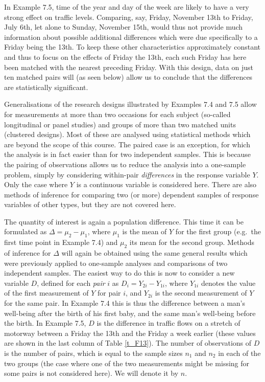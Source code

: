 In Example 7.5, time of the year and day of the week are likely to have
a very strong effect on traffic levels. Comparing, say, Friday, November
13th to Friday, July 6th, let alone to Sunday, November 15th, would thus
not provide much information about possible additional differences which
were due specifically to a Friday being the 13th. To keep these other
characteristics approximately constant and thus to focus on the effects
of Friday the 13th, each such Friday has here been matched with the
nearest preceding Friday. With this design, data on just ten
matched pairs will (as seen below) allow us to conclude that the
differences are statistically significant.

Generalisations of the research designs illustrated by Examples 7.4 and
7.5 allow for measurements at more than two occasions for each subject
(so-called longitudinal or panel studies) and groups of more than two
matched units (clustered designs). Most of these are
analysed using statistical methods which are  beyond the scope of
this course. The paired case is an exception, for which the analysis is
in fact easier than for two independent samples. This is because the
pairing of observations allows us to reduce the analysis into a
one-sample problem, simply by considering within-pair \emph{differences}
in the response variable $Y$. Only the case where $Y$ is a continuous
variable is considered here. There are also methods of inference for
comparing two (or more) dependent samples of response
variables of other types,
but they are not covered here.

The quantity of interest is again a population difference. This time it
can be formulated as $\Delta=\mu_{2}-\mu_{1}$, where $\mu_{1}$ is the
mean of $Y$ for the first group (e.g.\ the first time point in Example
7.4) and $\mu_{2}$ its mean for the second group. Methods of inference
for $\Delta$ will again be obtained using the same general results which
were previously applied to one-sample analyses and comparisons of two
independent samples. The easiest way to do this is now to consider a
new variable $D$, defined for each \emph{pair} $i$ as
$D_{i}=Y_{2i}-Y_{1i}$, where $Y_{1i}$ denotes the value of the first
measurement of $Y$ for pair $i$, and $Y_{2i}$ is the second measurement
of $Y$ for the same pair. In Example 7.4 this is thus the difference
between a man's well-being after the birth of his first baby, and the
same man's well-being before the birth. In Example 7.5, $D$ is the
difference in traffic flows on a stretch of motorway between a Friday
the 13th and the Friday a week earlier (these values are shown in the
last column of Table \ref{t_F13}). The number of observations of $D$ is
the number of pairs, which is equal to the sample sizes $n_{1}$ and
$n_{2}$ in each of the two groups (the case where one of the two
measurements might be missing for some pairs is not considered here). We
will denote it by $n$.

